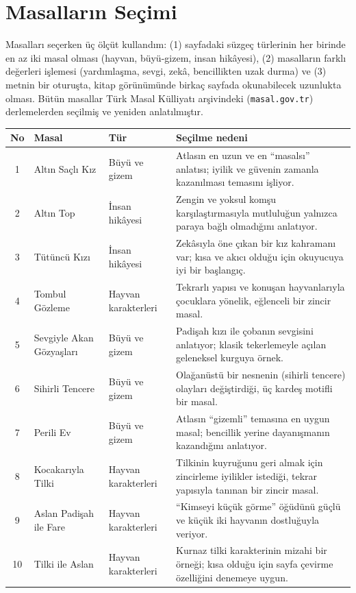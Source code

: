 \documentclass[12pt,a4paper]{article}
\begin{document}
\section{Masalların Seçimi}
Masalları seçerken üç ölçüt kullandım: (1) sayfadaki süzgeç türlerinin her birinde en az
iki masal olması (hayvan, büyü-gizem, insan hikâyesi), (2) masalların farklı değerleri
işlemesi (yardımlaşma, sevgi, zekâ, bencillikten uzak durma) ve (3) metnin bir oturuşta,
kitap görünümünde birkaç sayfada okunabilecek uzunlukta olması. Bütün masallar Türk Masal
Külliyatı arşivindeki (\texttt{masal.gov.tr}) derlemelerden seçilmiş ve yeniden anlatılmıştır.

\begin{longtable}{@{}c>{\raggedright\arraybackslash}p{4cm}>{\raggedright\arraybackslash}p{3cm}>{\raggedright\arraybackslash}p{5.4cm}@{}}
\toprule
\textbf{No} & \textbf{Masal} & \textbf{Tür} & \textbf{Seçilme nedeni} \\
\midrule
\endhead
1 & Altın Saçlı Kız & Büyü ve gizem & Atlasın en uzun ve en ``masalsı'' anlatısı; iyilik ve güvenin zamanla kazanılması temasını işliyor. \\
2 & Altın Top & İnsan hikâyesi & Zengin ve yoksul komşu karşılaştırmasıyla mutluluğun yalnızca paraya bağlı olmadığını anlatıyor. \\
3 & Tütüncü Kızı & İnsan hikâyesi & Zekâsıyla öne çıkan bir kız kahramanı var; kısa ve akıcı olduğu için okuyucuya iyi bir başlangıç. \\
4 & Tombul Gözleme & Hayvan karakterleri & Tekrarlı yapısı ve konuşan hayvanlarıyla çocuklara yönelik, eğlenceli bir zincir masal. \\
5 & Sevgiyle Akan Gözyaşları & Büyü ve gizem & Padişah kızı ile çobanın sevgisini anlatıyor; klasik tekerlemeyle açılan geleneksel kurguya örnek. \\
6 & Sihirli Tencere & Büyü ve gizem & Olağanüstü bir nesnenin (sihirli tencere) olayları değiştirdiği, üç kardeş motifli bir masal. \\
7 & Perili Ev & Büyü ve gizem & Atlasın ``gizemli'' temasına en uygun masal; bencillik yerine dayanışmanın kazandığını anlatıyor. \\
8 & Kocakarıyla Tilki & Hayvan karakterleri & Tilkinin kuyruğunu geri almak için zincirleme iyilikler istediği, tekrar yapısıyla tanınan bir zincir masal. \\
9 & Aslan Padişah ile Fare & Hayvan karakterleri & ``Kimseyi küçük görme'' öğüdünü güçlü ve küçük iki hayvanın dostluğuyla veriyor. \\
10 & Tilki ile Aslan & Hayvan karakterleri & Kurnaz tilki karakterinin mizahi bir örneği; kısa olduğu için sayfa çevirme özelliğini denemeye uygun. \\
\bottomrule
\end{longtable}
\end{document}

